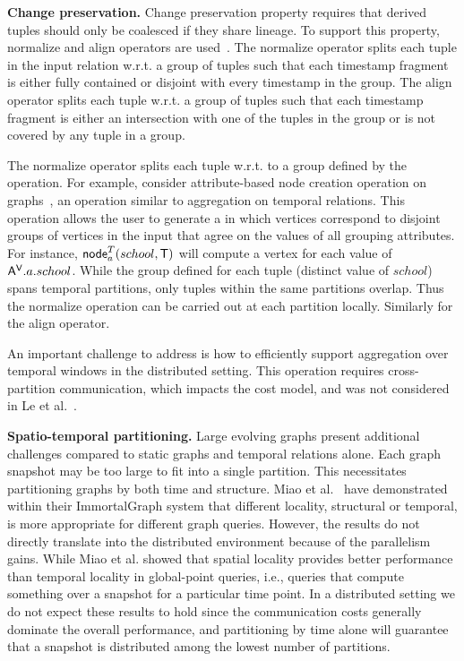 {\bf Change preservation.}  Change preservation property requires that
derived tuples should only be coalesced if they share lineage.  To
support this property, normalize and align operators are
used~\cite{Dignos2012}.  The normalize operator splits each tuple in
the input relation w.r.t. a group of tuples such that each timestamp
fragment is either fully contained or disjoint with every timestamp in
the group.  The align operator splits each tuple w.r.t. a group of
tuples such that each timestamp fragment is either an intersection
with one of the tuples in the group or is not covered by any tuple in
a group.

The normalize operator splits each tuple w.r.t. to a group defined by
the operation.  For example, consider attribute-based node creation
operation on graphs~\cite{PortalarXiv2016}, an operation similar to
aggregation on temporal relations.  This operation allows the user to
generate a \tg in which vertices correspond to disjoint groups of
vertices in the input that agree on the values of all grouping
attributes.  For instance, $\textsf{node}^T_a(school,\mathsf{T})$ will
compute a vertex for each value of $\mathsf{A^{V}}.a.school$.  While the group
defined for each tuple (distinct value of $school$) spans temporal
partitions, only tuples within the same partitions overlap.  Thus the
normalize operation can be carried out at each partition locally.
Similarly for the align operator.

An important challenge to address is how to efficiently support
aggregation over temporal windows in the distributed setting.  This
operation requires cross-partition communication, which impacts the
cost model, and was not considered in Le et al.~\cite{Le2013}.

{\bf Spatio-temporal partitioning.}  Large evolving graphs present
additional challenges compared to static graphs and temporal relations
alone.  Each graph snapshot may be too large to fit into a single
partition.  This necessitates partitioning graphs by both time and
structure.  Miao et al.~\cite{Miao2015} have demonstrated within their
ImmortalGraph system that different locality, structural or temporal,
is more appropriate for different graph queries.  However, the results
do not directly translate into the distributed environment because of
the parallelism gains.  While Miao et al. showed that spatial locality
provides better performance than temporal locality in global-point
queries, i.e., queries that compute something over a snapshot for a
particular time point.  In a distributed setting we do not expect
these results to hold since the communication costs generally dominate
the overall performance, and partitioning by time alone will guarantee
that a snapshot is distributed among the lowest number of partitions.

